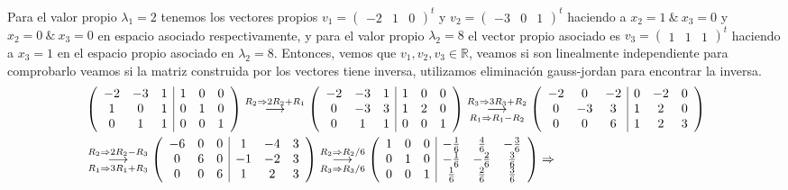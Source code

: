 \documentclass[11pt,letterpaper]{article}
\newcommand{\mR}{\mathbb{R}}
\newcommand{\grstep}[2][\relax]{%
   \ensuremath{\mathrel{
       {\mathop{\longrightarrow}\limits^{#2\mathstrut}_{
                                     \begin{subarray}{l} #1 \end{subarray}}}}}}
\begin{document}
\begin{enumerate}
Para el valor propio $\lambda_1=2$ tenemos los vectores propios $v_1=\begin{pmatrix}
-2 & 1 &0
\end{pmatrix}^t$ y $v_2= \begin{pmatrix}
-3 & 0 &1
\end{pmatrix}^t$ haciendo a $x_2=1\ \&\ x_3=0$ y $x_2=0\ \& \ x_3=0$ en espacio asociado respectivamente, y para el valor propio $\lambda_2=8$ el vector propio asociado es $v_3= \begin{pmatrix}
1 & 1 &1
\end{pmatrix}^t$ haciendo a $x_3=1$ en el espacio propio asociado en $\lambda_2=8$. Entonces, vemos que $v_1,v_2, v_3\in \mR$, veamos si son linealmente independiente para comprobarlo veamos si la matriz construida por los vectores tiene inversa, utilizamos eliminación gauss-jordan para encontrar la inversa.
\begin{align*}
&\left(\begin{array}{ccc|ccc}
-2 & -3 &  1&1&0&0\\
 1 &  0 &  1&0&1&0\\
 0 &  1 &  1&0&0&1
\end{array}\right)
%
\grstep[]{R_2 \Rightarrow 2R_2+R_1}
%
\left(\begin{array}{ccc|ccc}
-2 & -3 &  1&1&0&0\\
 0 & -3 &  3&1&2&0\\
 0 &  1 &  1&0&0&1
\end{array}\right)%
\grstep[R_1\Rightarrow R_1-R_2]{R_3 \Rightarrow 3R_3+R_2}
%
\left(\begin{array}{ccc|ccc}
-2 &  0 & -2&0&-2&0\\
 0 & -3 &  3&1&2&0\\
 0 &  0 &  6&1&2&3
\end{array}\right)\\
&\grstep[R_1\Rightarrow 3R_1+R_3]{R_2 \Rightarrow 2R_2-R_3}
%
\left(\begin{array}{ccc|ccc}
-6 & 0 &  0&1&-4&3\\
 0 & 6 &  0&-1&-2&3\\
 0 & 0 &  6&1&2&3
\end{array}\right)%
\grstep[R_3\Rightarrow R_3/6]{R_2 \Rightarrow R_2/6}
%
\left(\begin{array}{ccc|ccc}
 1 & 0 &  0&-\frac{1}{6}&\frac{4}{6}&-\frac{3}{6}\\
 0 & 1 &  0&-\frac{1}{6}&-\frac{2}{6}&\frac{3}{6}\\
 0 & 0 &  1&\frac{1}{6}&\frac{2}{6}&\frac{3}{6}
\end{array}\right)\Rightarrow \\

\end{align*}
\end{enumerate}
\end{document}

